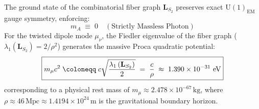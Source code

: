 \documentclass[
    12pt,
    a4paper,
    headings=normal,
    twoside=false,
    open=any,
    parskip=half
]{scrbook}
\let\hbar\relax
\begin{document}
\begin{phystheorem}\label{thm:ch2_topological_proca_mass}
The ground state of the combinatorial fiber graph $\mathbf{L}_{S_2}$ preserves exact $\mathrm{U}(1)_{\text{EM}}$ gauge symmetry, enforcing:
\begin{equation}
\boxed{m_A \;\equiv\; 0 \quad (\text{Strictly Massless Photon})}
\end{equation}
For the twisted dipole mode $\mu_\nu$, the Fiedler eigenvalue of the fiber graph ($\lambda_1(\mathbf{L}_{S_2}) = 2/\rho^2$) generates the massive Proca quadratic potential:
\begin{equation}
\boxed{m_\mu c^2 \;\coloneqq\; \hbar c \sqrt{\frac{\lambda_1\left(\mathbf{L}_{S_2}\right)}{2}} \;=\; \frac{\hbar c}{\rho} \;\approx\; 1.390 \times 10^{-31} \text{ eV}}
\label{eq:ch2_topological_proca_mass_formula}
\end{equation}
corresponding to a physical rest mass of $m_\mu \approx 2.478 \times 10^{-67}\,\text{kg}$, where $\rho \approx 46\,\text{Mpc} \approx 1.4194 \times 10^{24}\,\text{m}$ is the gravitational boundary horizon.
\end{phystheorem}
\end{document}
